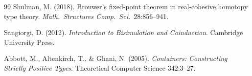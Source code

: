 \documentclass[12pt]{article}
\theoremstyle{definition}
\theoremstyle{remark}
\begin{document}
\begin{thebibliography}{99}
Shulman, M. (2018). Brouwer's fixed-point theorem in real-cohesive
homotopy type theory. \emph{Math.\ Structures Comp.\ Sci.}\ 28:856--941.

Sangiorgi, D. (2012). \emph{Introduction to Bisimulation and
Coinduction}. Cambridge University Press.

Abbott, M., Altenkirch, T., \& Ghani, N. (2005).
\emph{Containers: Constructing Strictly Positive Types}.
Theoretical Computer Science 342:3--27.

\end{thebibliography}
\end{document}
